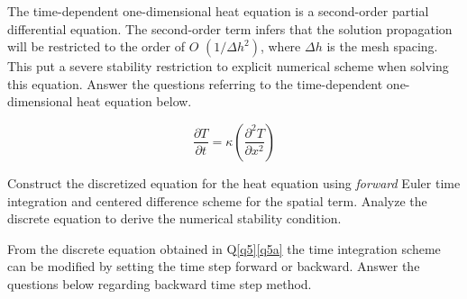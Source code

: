 \question{} \label{q5}

	The time-dependent one-dimensional heat equation is a second-order partial differential equation. The second-order term infers that the solution propagation will be restricted to the order of $O$ $(1/\Delta h^{2})$, where $\Delta h$ is the mesh spacing. This put a severe stability restriction to explicit numerical scheme when solving this equation. Answer the questions referring to the time-dependent one-dimensional heat equation below.
	

\begin{equation}
\frac{\partial T}{\partial t} = \kappa \left( \frac{\partial^2 T}{\partial x^2} \right) \nonumber
\end{equation}		
		
		\listbeginx

\item \label{q5a} Construct the discretized equation for the heat equation using \textit{forward} Euler time integration and centered difference scheme for the spatial term. Analyze the discrete equation to derive the numerical stability condition.

		

\item \label{q5b} From the discrete equation obtained in Q\ref{q5}\ref{q5a} the time integration scheme can be modified by setting the time step forward or backward. Answer the questions below regarding backward time step method.     


